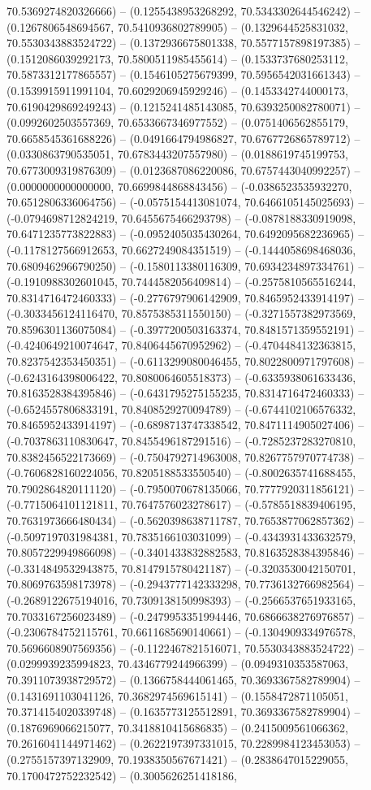 70.5369274820326666) -- (0.1255438953268292, 70.5343302644546242) -- (0.1267806548694567, 70.5410936802789905) -- (0.1329644525831032, 70.5530343883524722) -- (0.1372936675801338, 70.5577157898197385) -- (0.1512086039292173, 70.5800511985455614) -- (0.1533737680253112, 70.5873312177865557) -- (0.1546105275679399, 70.5956542031661343) -- (0.1539915911991104, 70.6029206945929246) -- (0.1453342744000173, 70.6190429869249243) -- (0.1215241485143085, 70.6393250082780071) -- (0.0992602503557369, 70.6533667346977552) -- (0.0751406562855179, 70.6658545361688226) -- (0.0491664794986827, 70.6767726865789712) -- (0.0330863790535051, 70.6783443207557980) -- (0.0188619745199753, 70.6773009319876309) -- (0.0123687086220086, 70.6757443040992257) -- (0.0000000000000000, 70.6699844868843456) -- (-0.0386523535932270, 70.6512806336064756) -- (-0.0575154413081074, 70.6466105145025693) -- (-0.0794698712824219, 70.6455675466293798) -- (-0.0878188330919098, 70.6471235773822883) -- (-0.0952405035430264, 70.6492095682236965) -- (-0.1178127566912653, 70.6627249084351519) -- (-0.1444058698468036, 70.6809462966790250) -- (-0.1580113380116309, 70.6934234897334761) -- (-0.1910988302601045, 70.7444582056409814) -- (-0.2575810565516244, 70.8314716472460333) -- (-0.2776797906142909, 70.8465952433914197) -- (-0.3033456124116470, 70.8575385311550150) -- (-0.3271557382973569, 70.8596301136075084) -- (-0.3977200503163374, 70.8481571359552191) -- (-0.4240649210074647, 70.8406445670952962) -- (-0.4704484132363815, 70.8237542353450351) -- (-0.6113299080046455, 70.8022800971797608) -- (-0.6243164398006422, 70.8080064605518373) -- (-0.6335938061633436, 70.8163528384395846) -- (-0.6431795275155235, 70.8314716472460333) -- (-0.6524557806833191, 70.8408529270094789) -- (-0.6744102106576332, 70.8465952433914197) -- (-0.6898713747338542, 70.8471114905027406) -- (-0.7037863110830647, 70.8455496187291516) -- (-0.7285237283270810, 70.8382456522173669) -- (-0.7504792714963008, 70.8267757970774738) -- (-0.7606828160224056, 70.8205188533550540) -- (-0.8002635741688455, 70.7902864820111120) -- (-0.7950070678135066, 70.7777920311856121) -- (-0.7715064101121811, 70.7647576023278617) -- (-0.5785518839406195, 70.7631973666480434) -- (-0.5620398638711787, 70.7653877062857362) -- (-0.5097197031984381, 70.7835166103031099) -- (-0.4343931433632579, 70.8057229949866098) -- (-0.3401433832882583, 70.8163528384395846) -- (-0.3314849532943875, 70.8147915780421187) -- (-0.3203530042150701, 70.8069763598173978) -- (-0.2943777142333298, 70.7736132766982564) -- (-0.2689122675194016, 70.7309138150998393) -- (-0.2566537651933165, 70.7033167256023489) -- (-0.2479953351994446, 70.6866638276976857) -- (-0.2306784752115761, 70.6611685690140661) -- (-0.1304909334976578, 70.5696608907569356) -- (-0.1122467821516071, 70.5530343883524722) -- (0.0299939235994823, 70.4346779244966399) -- (0.0949310353587063, 70.3911073938729572) -- (0.1366758444061465, 70.3693367582789904) -- (0.1431691103041126, 70.3682974569615141) -- (0.1558472871105051, 70.3714154020339748) -- (0.1635773125512891, 70.3693367582789904) -- (0.1876969066215077, 70.3418810415686835) -- (0.2415009561066362, 70.2616041144971462) -- (0.2622197397331015, 70.2289984123453053) -- (0.2755157397132909, 70.1938350567671421) -- (0.2838647015229055, 70.1700472752232542) -- (0.3005626251418186, 